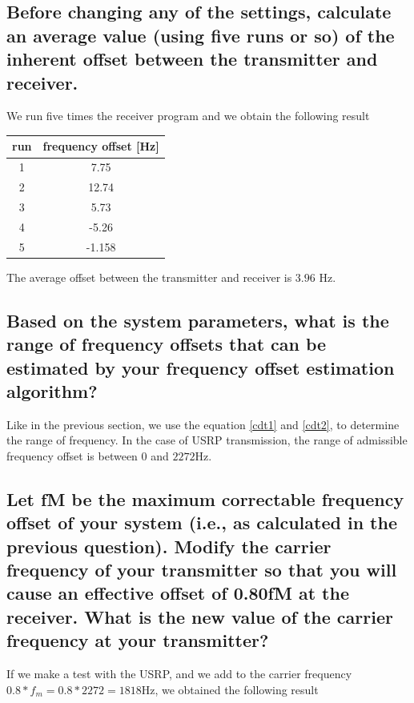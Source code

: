\documentclass[frenchb, oneside, headings=normal]{scrartcl}
\begin{document}
\subsection{Before changing any of the settings, calculate an average value (using five runs or so) of the inherent offset between the transmitter and receiver.}

We run five times the receiver program and we obtain the following result
 
\begin{center}
	\begin{tabular}{c|c}
		run & frequency offset [\si{\hertz}]\\
		\hline
		1 & 7.75\\
		2 & 12.74\\
		3 & 5.73\\
		4 & -5.26\\
		5 & -1.158\\
	\end{tabular}
\end{center}

The average offset between the transmitter and receiver is $3.96$ \si{\hertz}. 


\subsection{Based on the system parameters, what is the range of frequency offsets that can be estimated by your frequency offset estimation algorithm?}

Like in the previous section, we use the equation \ref{cdt1} and \ref{cdt2}, to determine the range of frequency. In the case of USRP transmission, the range of admissible frequency offset is between $0$ and $2272 \si{\hertz}$.

\subsection{Let fM be the maximum correctable frequency offset of your system (i.e., as calculated in the previous question). Modify the carrier frequency of your transmitter so that you will cause an effective offset of 0.80fM at the receiver. What is the new value of the carrier frequency at your transmitter?}

If we make a test with the USRP, and we add to the carrier frequency $0.8*f_m=0.8*2272=1818 \si{\hertz}$, we obtained the following result
\end{document}

